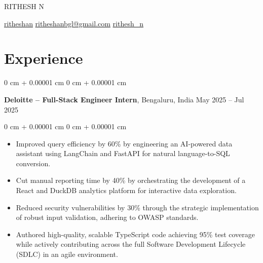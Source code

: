 \documentclass[10pt, letterpaper]{article}
\newenvironment{highlights}{
    \begin{itemize}[
        topsep=0.10 cm,
        parsep=0.10 cm,
        partopsep=0pt,
        itemsep=0pt,
        leftmargin=0 cm + 10pt
    ]
}{
    \end{itemize}
} %
\newenvironment{onecolentry}{
    \begin{adjustwidth}{
        0 cm + 0.00001 cm
    }{
        0 cm + 0.00001 cm
    }
}{
    \end{adjustwidth}
} %
\newenvironment{twocolentry}[2][]{
    \onecolentry
    \def\secondColumn{#2}
    \setcolumnwidth{\fill, 4.5 cm}
    \begin{paracol}{2}
}{
    \switchcolumn \raggedleft \secondColumn
    \end{paracol}
    \endonecolentry
} %
\newenvironment{header}{
    \setlength{\topsep}{0pt}\par\kern\topsep\centering\linespread{1.5}
}{
    \par\kern\topsep
} %
\begin{document}
  \begin{header}
    \fontsize{25 pt}{25 pt}\selectfont RITHESH N

    \vspace{5 pt}

    \normalsize
    \mbox{\raisebox{-0.1\height}\faLinkedin\hspace{2pt}\href{https://www.linkedin.com/in/ritheshan/}{ritheshan}} \hspace{10pt}%
    \mbox{\raisebox{-0.1\height}\faEnvelope\hspace{2pt}\href{mailto:ritheshanbgl@gmail.com}{ritheshanbgl@gmail.com}} \hspace{10pt}%
    \mbox{\hspace{2pt}\href{https://leetcode.com/rithesh_n}{rithesh\_n}}%
\end{header}

    \vspace{5 pt - 0.3 cm}

    \section{Experience}

        \begin{twocolentry}{
            May 2025 – Jul 2025
        }
            \textbf{Deloitte – Full-Stack Engineer Intern}, Bengaluru, India\end{twocolentry}

        \vspace{0.10 cm}
        \begin{onecolentry}
            \begin{highlights}
                \item Improved query efficiency by 60\% by engineering an AI-powered data assistant using LangChain and FastAPI for natural language-to-SQL conversion.
                \item Cut manual reporting time by 40\% by orchestrating the development of a React and DuckDB analytics platform for interactive data exploration.
                \item Reduced security vulnerabilities by 30\% through the strategic implementation of robust input validation, adhering to OWASP standards.
                \item Authored high-quality, scalable TypeScript code achieving 95\% test coverage while actively contributing across the full Software Development Lifecycle (SDLC) in an agile environment.
            \end{highlights}
        \end{onecolentry}
\end{document}
